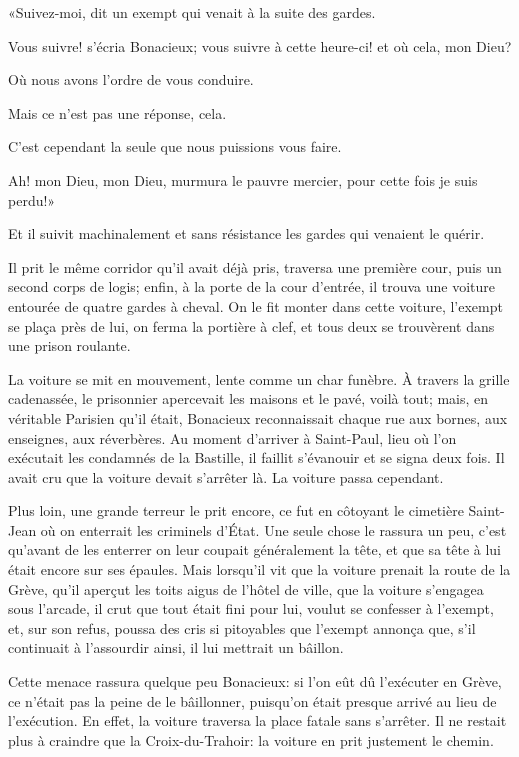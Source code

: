 «Suivez-moi, dit un exempt qui venait à la suite des gardes. 

\speak  Vous suivre! s'écria Bonacieux; vous suivre à cette heure-ci! et où cela, mon Dieu? 

\speak  Où nous avons l'ordre de vous conduire. 

\speak  Mais ce n'est pas une réponse, cela. 

\speak  C'est cependant la seule que nous puissions vous faire. 

\speak  Ah! mon Dieu, mon Dieu, murmura le pauvre mercier, pour cette fois je suis perdu!» 

Et il suivit machinalement et sans résistance les gardes qui venaient le quérir. 

Il prit le même corridor qu'il avait déjà pris, traversa une première cour, puis un second corps de logis; enfin, à la porte de la cour d'entrée, il trouva une voiture entourée de quatre gardes à cheval. On le fit monter dans cette voiture, l'exempt se plaça près de lui, on ferma la portière à clef, et tous deux se trouvèrent dans une prison roulante. 

La voiture se mit en mouvement, lente comme un char funèbre. À travers la grille cadenassée, le prisonnier apercevait les maisons et le pavé, voilà tout; mais, en véritable Parisien qu'il était, Bonacieux reconnaissait chaque rue aux bornes, aux enseignes, aux réverbères. Au moment d'arriver à Saint-Paul, lieu où l'on exécutait les condamnés de la Bastille, il faillit s'évanouir et se signa deux fois. Il avait cru que la voiture devait s'arrêter là. La voiture passa cependant. 

Plus loin, une grande terreur le prit encore, ce fut en côtoyant le cimetière Saint-Jean où on enterrait les criminels d'État. Une seule chose le rassura un peu, c'est qu'avant de les enterrer on leur coupait généralement la tête, et que sa tête à lui était encore sur ses épaules. Mais lorsqu'il vit que la voiture prenait la route de la Grève, qu'il aperçut les toits aigus de l'hôtel de ville, que la voiture s'engagea sous l'arcade, il crut que tout était fini pour lui, voulut se confesser à l'exempt, et, sur son refus, poussa des cris si pitoyables que l'exempt annonça que, s'il continuait à l'assourdir ainsi, il lui mettrait un bâillon. 

Cette menace rassura quelque peu Bonacieux: si l'on eût dû l'exécuter en Grève, ce n'était pas la peine de le bâillonner, puisqu'on était presque arrivé au lieu de l'exécution. En effet, la voiture traversa la place fatale sans s'arrêter. Il ne restait plus à craindre que la Croix-du-Trahoir: la voiture en prit justement le chemin. 

